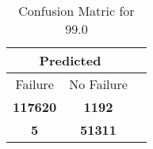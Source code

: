 \begin{table}[] 
\caption{Confusion Matric for 99.0} 
\label{Table: Prediction Accuracy-DMD99.0OnlySunEKF-resetReflectionEKF-top2perfectNoFailurePrediction-Reflection} 
\centering 
\begin{tabular} 
 {@{}ccc@{}} 
\toprule 
\multicolumn{2}{c}{\textbf{Predicted}}
 \\ \midrule 
\multicolumn{1}{|c|}{Failure} & 
\multicolumn{1}{c|}{No Failure}
 \\ \midrule 
\multicolumn{1}{|c|}{\color{green}\textbf{117620}} & 
\multicolumn{1}{c|}{\color{red}\textbf{1192}}
 \\ \midrule 
\multicolumn{1}{|c|}{\color{red}\textbf{5}} & 
\multicolumn{1}{c|}{\color{green}\textbf{51311}}
 \\ \bottomrule 
\end{tabular} 
\end{table} 

